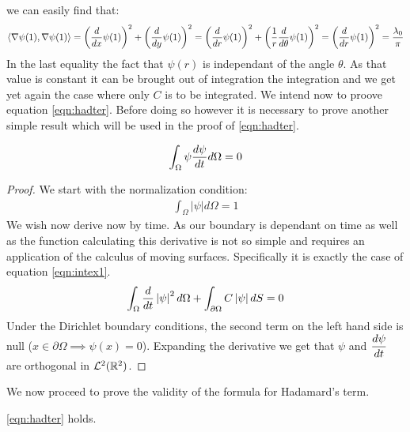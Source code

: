 \documentclass[../main.tex]{subfiles}
\begin{document}
		we can easily find that:
		\begin{gather}
			\left<\nabla\psi(1),\nabla\psi(1)\right>=\left(\dfrac{d}{dx}\psi(1) \right)^{2}+\left(\dfrac{d}{dy}\psi(1) \right)^{2}=\left(\dfrac{d}{dr}\psi(1)\right)^{2}+\left(\dfrac{1}{r}\dfrac{d}{d\theta}\psi(1)\right)^{2}=\left(\dfrac{d}{dr}\psi(1)\right)^{2}=\dfrac{\lambda_{0}}{\pi}
		\end{gather}
		In the last equality the fact that $ \psi(r) $ is independant of the angle $ \theta $. As that value is constant it can be brought out of integration the integration and we get yet again the case where only $ C $ is to be integrated.
		We intend now to proove equation \ref{eqn:hadter}. Before doing so however it is necessary to prove another simple result which will be used in the proof of \ref{eqn:hadter}.
		\begin{lem}
			\label{lem:psipsitorth}
			\begin{gather}
			\int_{\Omega}\psi\dfrac{d\psi}{dt} d\Omega =0
			\end{gather}
		\end{lem}
		\begin{proof}
			We start with the normalization condition:
			\begin{gather}
			\int_{\Omega}\left|\psi\right|d\Omega=1
			\end{gather}
			We wish now derive now by time. As our boundary is dependant on time as well as the function calculating this derivative is not so simple and requires an application of the calculus of moving surfaces. Specifically it is exactly the case of equation \ref{eqn:intex1}. 
			\begin{gather}
			\int_{\Omega}\dfrac{d}{dt}\left|\psi\right|^{2}d\Omega+\int_{\partial \Omega}C\left|\psi\right|dS=0
			\end{gather}
			Under the Dirichlet boundary conditions, the second term on the left hand side is null ($ x\in\partial\Omega\implies\psi(x)=0 $). Expanding the derivative we get that $ \psi $ and $ \dfrac{d\psi}{dt} $ are orthogonal in $ \mathcal{L}^{2}(\mathbb{R}^{2}) $.
		\end{proof}
		We now proceed to prove the validity of the formula for Hadamard's term.
		\begin{thm}
			\ref{eqn:hadter} holds.
		\end{thm}
\end{document}
